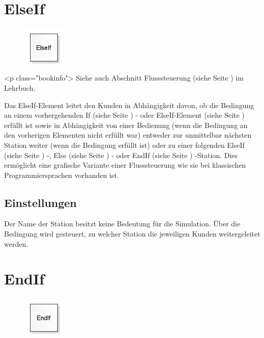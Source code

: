 \section{ElseIf}
\label{ref:ModelElementLogicElseIf}

\begin{figure}
\vspace{-22pt}
\includegraphics[width=2cm]{imageModelElementLogicElseIf.png}
\vspace{-22pt}
\end{figure}

<p class="bookinfo">
Siehe auch Abschnitt Flusssteuerung (siehe Seite \pageref{ref:book:8.10}) im Lehrbuch.

Das ElseIf-Element leitet den Kunden in Abhängigkeit davon, ob die Bedingung
an einem vorhergehenden If (siehe Seite \pageref{ref:ModelElementLogicIf}) - oder
ElseIf-Element (siehe Seite \pageref{ref:ModelElementLogicElseIf}) erfüllt ist
sowie in Abhängigkeit von einer Bedienung (wenn die Bedingung an den vorherigen
Elementen nicht erfüllt war) entweder zur unmittelbar nächsten Station weiter
(wenn die Bedingung erfüllt ist) oder zu einer folgenden
ElseIf (siehe Seite \pageref{ref:ModelElementLogicElseIf}) -,
Else (siehe Seite \pageref{ref:ModelElementLogicElse}) - oder
EndIf (siehe Seite \pageref{ref:ModelElementLogicEndIf}) -Station.
Dies ermöglicht eine grafische Variante einer Flusssteuerung wie sie bei
klassischen Programmiersprachen vorhanden ist.

\subsection*{Einstellungen}

Der Name der Station besitzt keine Bedeutung für die Simulation. Über die Bedingung
wird gesteuert, zu welcher Station die jeweiligen Kunden weitergeleitet werden.


\section{EndIf}
\label{ref:ModelElementLogicEndIf}

\begin{figure}
\vspace{-22pt}
\includegraphics[width=2cm]{imageModelElementLogicEndIf.png}
\vspace{-22pt}
\end{figure}

